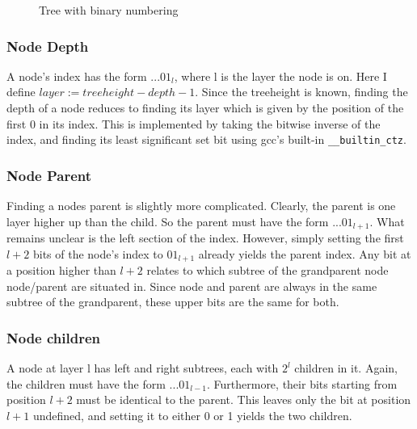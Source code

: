 \documentclass[twoside,twocolumn,hidelinks]{article}
\begin{document}
\begin{figure}
      \centering
      \caption{Tree with binary numbering}
      \label{fig:tree_inorder_binary}
\end{figure}

\subsubsection{Node Depth}
A node's index has the form $...01_l$, where l is the layer the node is on. Here I define $layer := treeheight - depth - 1$. Since the treeheight is known, finding the depth of a node reduces to finding its layer which is given by the position of the first 0 in its index. This is implemented by taking the bitwise inverse of the index, and finding its least significant set bit using gcc's built-in \texttt{\_\_builtin\_ctz}.

\subsubsection{Node Parent}
Finding a nodes parent is slightly more complicated. Clearly, the parent is one layer higher up than the child. So the parent must have the form $...01_{l+1}$. What remains unclear is the left section of the index. However, simply setting the first $l+2$ bits of the node's index to $01_{l+1}$ already yields the parent index. Any bit at a position higher than $l+2$ relates to which subtree of the grandparent node node/parent are situated in. Since node and parent are always in the same subtree of the grandparent, these upper bits are the same for both.

\subsubsection{Node children}
A node at layer l has left and right subtrees, each with $2^l$ children in it. Again, the children must have the form $...01_{l-1}$. Furthermore, their bits starting from position $l+2$ must be identical to the parent. This leaves only the bit at position $l+1$ undefined, and setting it to either 0 or 1 yields the two children.
\end{document}
